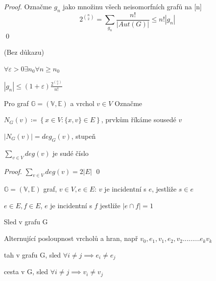\documentclass[../main.tex]{subfiles}
\begin{document}
\begin{proof}
    Označme $g_n$ jako množinu všech neisomorfních grafů na [n]
    \begin{equation*}
        2^{\binom{n}{2}} = \sum_{g_n} \frac{n!}{|Aut(G)|} \leq n! |g_n|
    \end{equation*}
    \qed
\end{proof}

\begin{claim}
    (Bez důkazu)

    $\forall\varepsilon>0 \exists n_0 \forall n\geq n_0$

    $|g_n|\leq (1+\varepsilon) \frac{2^{\binom{n}{2}}}{n!}$
\end{claim}


\begin{definition}
    Pro graf $\mathbb{G} = (\mathbb{V}, \mathbb{E})$ a vrchol $v\in V$ Označme

    $N_G (v) \coloneq \left\{ x\in V: \{x, v\} \in E \right\}$, prvkům říkáme sousedé $v$ 

    $|N_G (v)| = deg_G(v)$, stupeň
\end{definition}


\begin{claim}
    $\sum_{v\in V} deg (v)$ je sudé číslo
\end{claim}
\begin{proof}
    $\sum_{v\in V} deg (v) = 2|E|$ \qed
\end{proof}

\begin{definition}
    $\mathbb{G} = (\mathbb{V}, \mathbb{E})$ graf, $v\in V, e\in E$: $v$ je incidentní s $e$, jestliže $s\in e$

    $e\in E, f\in E$, $e$ je incidentní s $f$ jestliže $|e\cap f| = 1$
\end{definition}


\begin{definition}
    Sled v grafu G

    Alternující posloupnost vrcholů a hran, např $v_0, e_1, v_1, e_2, v_2 ......... e_k v_k$ 
\end{definition}

\begin{definition}
    tah v grafu G, sled $\forall i\neq j \implies e_i \neq e_j$
\end{definition}

\begin{definition}
    cesta v G, sled $\forall i\neq j \implies v_i \neq v_j$

\end{definition}
\end{document}
